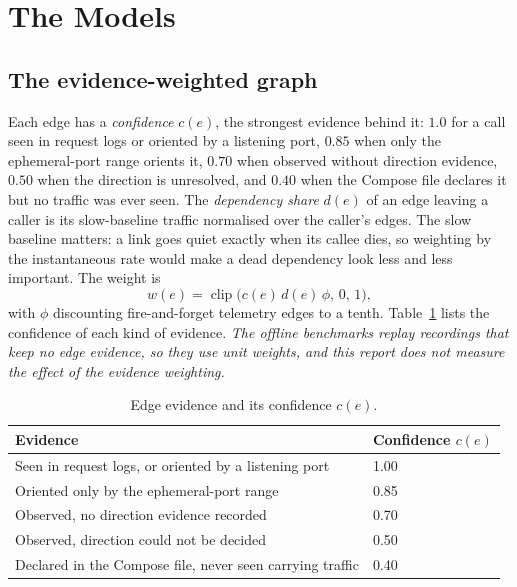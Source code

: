 \section{The Models}

\subsection{The evidence-weighted graph}
\label{sec:graph}
Each edge has a \emph{confidence} $c(e)$, the strongest evidence behind it: $1.0$ for a call seen in request logs or oriented by a listening port, $0.85$ when only the ephemeral-port range orients it, $0.70$ when observed without direction evidence, $0.50$ when the direction is unresolved, and $0.40$ when the Compose file declares it but no traffic was ever seen. The \emph{dependency share} $d(e)$ of an edge leaving a caller is its slow-baseline traffic normalised over the caller's edges. The slow baseline matters: a link goes quiet exactly when its callee dies, so weighting by the instantaneous rate would make a dead dependency look less and less important. The weight is
\[
w(e) = \operatorname{clip}\bigl(c(e)\, d(e)\, \phi,\, 0,\, 1\bigr),
\]
with $\phi$ discounting fire-and-forget telemetry edges to a tenth. Table~\ref{tab:conf} lists the confidence of each kind of evidence. \emph{The offline benchmarks replay recordings that keep no edge evidence, so they use unit weights, and this report does not measure the effect of the evidence weighting.}


\begin{table}[!htbp]
\centering
\caption{Edge evidence and its confidence $c(e)$.}
\label{tab:conf}
\small
\begin{tabular}{ll}
\toprule
\textbf{Evidence} & \textbf{Confidence $c(e)$}\\
\midrule
Seen in request logs, or oriented by a listening port & 1.00\\
Oriented only by the ephemeral-port range & 0.85\\
Observed, no direction evidence recorded & 0.70\\
Observed, direction could not be decided & 0.50\\
Declared in the Compose file, never seen carrying traffic & 0.40\\
\bottomrule
\end{tabular}
\end{table}


